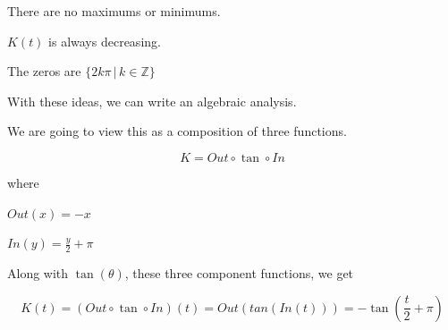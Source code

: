 \documentclass{ximera}
\begin{document}
{{\begin{idea}
\begin{image}
\end{image}

There are no maximums or minimums.

$K(t)$ is always decreasing.

The zeros are $\{  2 k \pi \, | \, k \in \mathbb{Z}    \}$


With these ideas, we can write an algebraic analysis.


\end{idea}












\begin{template}


We are going to view this as a composition of three functions.


\[
K = Out \circ \tan \circ In
\]


where


$Out(x) = -x$ 


$In(y) = \frac{y}{2} + \pi$ 




Along with $\tan(\theta)$, these three component functions, we get



\[
K(t) = (Out \circ \tan \circ In)(t) = Out(tan(In(t)))  = -\tan\left( \frac{t}{2} + \pi \right)
\]





\end{template}}}
\end{document}

